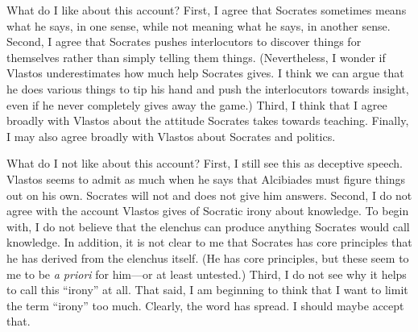 \documentclass[12pt,letterpaper]{article}
\begin{document}
What do I like about this account?
First, I agree that Socrates sometimes means what he says, in one sense, while not meaning what he says, in another sense.
Second, I agree that Socrates pushes interlocutors to discover things for themselves rather than simply telling them things.
(Nevertheless, I wonder if Vlastos underestimates how much help Socrates gives.
I think we can argue that he does various things to tip his hand and push the interlocutors towards insight, even if he never completely gives away the game.)
Third, I think that I agree broadly with Vlastos about the attitude Socrates takes towards teaching.
Finally, I may also agree broadly with Vlastos about Socrates and politics.

What do I not like about this account?
First, I still see this as deceptive speech.
Vlastos seems to admit as much when he says that Alcibiades must figure things out on his own.
Socrates will not and does not give him answers.
Second, I do not agree with the account Vlastos gives of Socratic irony about knowledge.
To begin with, I do not believe that the elenchus can produce anything Socrates would call knowledge.
In addition, it is not clear to me that Socrates has core principles that he has derived from the elenchus itself.
(He has core principles, but these seem to me to be \textit{a priori} for him—or at least untested.)
Third, I do not see why it helps to call this ``irony'' at all.
That said, I am beginning to think that I want to limit the term ``irony'' too much.
Clearly, the word has spread.
I should maybe accept that.

\newpage
\pagestyle{references}

\nocite{*}
\printbibliography[filter=primary,title={Primary Sources}]
\printbibliography[filter=secondary,title={Secondary Sources}]
\end{document}
